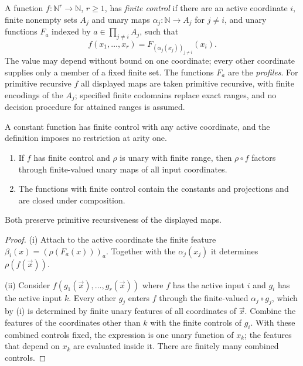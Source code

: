 \begin{definition}
\label{obs:def:fc}
A function $f\colon\mathbb{N}^r\to\mathbb{N}$, $r\ge 1$, has \emph{finite
control} if there are an active coordinate $i$, finite nonempty sets $A_j$ and
unary maps $\alpha_j\colon\mathbb{N}\to A_j$ for $j\ne i$, and unary functions
$F_a$ indexed by $a\in\prod_{j\ne i}A_j$, such that
\[
f(x_1,\dots,x_r)=F_{(\alpha_j(x_j))_{j\ne i}}(x_i).
\]
The value may depend without bound on one coordinate; every other coordinate
supplies only a member of a fixed finite set. The functions $F_a$ are the
\emph{profiles}. For primitive recursive $f$ all displayed maps are taken
primitive recursive, with finite encodings of the $A_j$; specified finite
codomains replace exact ranges, and no decision procedure for attained ranges
is assumed.
\end{definition}

A constant function has finite control with any active coordinate, and the
definition imposes no restriction at arity one.

\begin{lemma}
\label{obs:lem:fc-comp}
\begin{enumerate}[label=(\roman*)]
\item If $f$ has finite control and $\rho$ is unary with finite range, then
$\rho\circ f$ factors through finite-valued unary maps of all input
coordinates.
\item The functions with finite control contain the constants and projections
and are closed under composition.
\end{enumerate}
Both preserve primitive recursiveness of the displayed maps.
\end{lemma}

\begin{proof}
(i) Attach to the active coordinate the finite feature
$\beta_i(x)=(\rho(F_a(x)))_a$. Together with the $\alpha_j(x_j)$ it determines
$\rho(f(\vec x))$.

(ii) Consider $f(g_1(\vec x),\dots,g_r(\vec x))$ where $f$ has the active
input $i$ and $g_i$ has the active input $k$. Every other $g_j$ enters $f$
through the finite-valued $\alpha_j\circ g_j$, which by (i) is determined by
finite unary features of all coordinates of $\vec x$. Combine the features of
the coordinates other than $k$ with the finite controls of $g_i$. With these
combined controls fixed, the expression is one unary function of $x_k$; the
features that depend on $x_k$ are evaluated inside it. There are finitely many
combined controls.
\end{proof}

